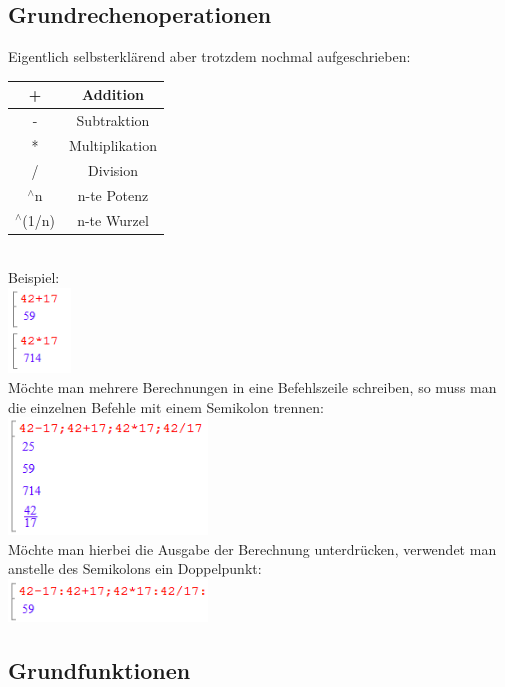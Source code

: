 \documentclass[11pt,final]{scrreprt}
\newcommand{\br} {\medskip\\}
\newcommand{\gbr} {\bigskip\\}
\begin{document}
\subsection{Grundrechenoperationen}

Eigentlich selbsterklärend aber trotzdem nochmal aufgeschrieben:\br
\begin{tabular}{|c|c|}
\hline
+ & Addition\\
\hline
- & Subtraktion \\
\hline
* & Multiplikation \\
\hline
/ & Division \\
\hline
$^\wedge$n & n-te Potenz \\
\hline
$^\wedge$(1/n) & n-te Wurzel\\
\hline
\end{tabular}
\gbr
Beispiel:\\
\includegraphics[width = 47pt]{images/grundrechenarten_1}\br
Möchte man mehrere Berechnungen in eine Befehlszeile schreiben, so muss man die einzelnen Befehle mit einem Semikolon trennen:\br
\includegraphics[width = 150pt]{images/grundrechenarten_2}\\
Möchte man hierbei die Ausgabe der Berechnung unterdrücken, verwendet man anstelle des Semikolons ein Doppelpunkt:\br
\includegraphics[width = 150pt]{images/grundrechenarten_3}

\subsection{Grundfunktionen}
\end{document}
